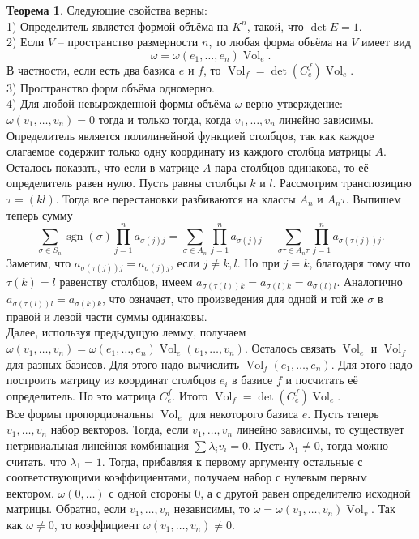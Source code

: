 \documentclass[10pt,a4paper,oneside]{book} %
\theoremstyle{definition}
\newtheorem{thm}{Теорема}
\newcommand{\Vol}{\operatorname{Vol}}
\newcommand{\sgn}{\operatorname{sgn}}
\begin{document}
\begin{thm} Следующие свойства верны:\\
1) Определитель является формой объёма на $K^n$, такой, что $\det E=1$.\\
2) Если $V$ -- пространство размерности $n$, то любая форма объёма на $V$ имеет вид $$\omega=\omega(e_1,\dots,e_n)\Vol_e.$$
В частности, если есть два базиса $e$ и $f$, то $\Vol_{f}=\det(C^f_{e}) \Vol_{e}$.\\
3) Пространство форм объёма одномерно.\\
4) Для любой невырожденной формы объёма $\omega$ верно утверждение: $\omega(v_1,\dots,v_n)=0$ тогда и только тогда, когда $v_1,\dots,v_n$ линейно зависимы.
\proof Определитель является полилинейной функцией столбцов, так как  каждое слагаемое содержит только одну координату из каждого столбца матрицы $A$. Осталось показать, что если в матрице $A$ пара столбцов одинакова, то её определитель равен нулю.
Пусть равны столбцы $k$ и $l$. Рассмотрим транспозицию $\tau=(kl)$. Тогда все перестановки разбиваются на классы $A_n$ и $A_n\tau$. Выпишем теперь сумму
$$\sum_{\sigma \in S_n} \sgn(\sigma)\prod_{j=1}^n a_{\sigma(j)j} = \sum_{\sigma \in A_n} \prod_{j=1}^n a_{\sigma(j)j}- \sum_{\sigma\tau \in A_n\tau} \prod_{j=1}^n a_{\sigma(\tau(j))j}.$$
Заметим, что $a_{\sigma(\tau(j))j}=a_{\sigma(j)j}$, если $j\neq k,l$. Но при  $j=k$, благодаря тому что $\tau(k)=l$  равенству столбцов, имеем $a_{\sigma(\tau(l))k}=a_{\sigma(l)k}=a_{\sigma(l)l}$. Аналогично $a_{\sigma(\tau(l))l}=a_{\sigma(k)k}$, что означает, что произведения для одной и той же $\sigma$ в правой и левой части суммы одинаковы.\\

Далее, используя предыдущую лемму, получаем $\omega(v_1,\dots,v_n)=\omega(e_1,\dots,e_n)\Vol_e(v_1,\dots,v_n)$. Осталось связать $\Vol_e$ и $\Vol_f$ для разных базисов. Для этого надо вычислить $\Vol_f(e_1,\dots,e_n)$. Для этого надо построить матрицу из координат столбцов $e_i$ в базисе $f$ и посчитать её определитель. Но это матрица $C_{e}^f$. Итого $\Vol_{f}=\det(C^f_{e}) \Vol_{e}$. \\
Все формы пропорциональны $\Vol_e$ для некоторого базиса $e$.
Пусть теперь $v_1,\dots,v_n$ набор векторов. Тогда, если $v_1,\dots,v_n$ линейно зависимы, то существует нетривиальная линейная комбинация $\sum \lambda_i v_i=0$. Пусть $\lambda_1\neq 0$, тогда можно считать, что $\lambda_1=1$. Тогда, прибавляя к первому аргументу остальные с соответствующими коэффициентами, получаем набор с нулевым первым вектором. $\omega(0,\dots)$ с одной стороны 0, а с другой равен определителю исходной матрицы.
Обратно, если $v_1,\dots,v_n$ независимы, то $\omega=\omega(v_1,\dots,v_n)\Vol_v$. Так как $\omega \neq 0$, то коэффициент $\omega(v_1, \dots,v_n)\neq 0$.
\endproof
\end{thm}
\end{document}
